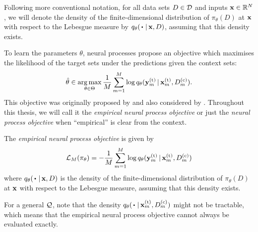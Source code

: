 \documentclass[12pt, twoside]{report}
\begin{document}
Following more conventional notation, for all data sets $D \in \mathcal{D}$ and inputs $\mathbf{x} \in \mathbb{R}^N$,
we will denote the 
density of the finite-dimensional distribution of $\pi_\theta(D)$ at $\mathbf{x}$ with respect to the Lebesgue measure by $q_\theta(\vardot \cond \vx, D)$, assuming that this density exists.

To learn the parameters $\theta$, neural processes propose an objective which maximises the likelihood of the target sets under the predictions given the context sets:
\begin{equation}
    \hat\theta 
    \in
    \argmax_{\theta \in \Theta} \frac1M \sum_{m=1}^M \log q_\theta(\vy\us{(t)}_m \cond \vx\us{(t)}_m, D\us{(c)}_m).
\end{equation}
This objective was originally proposed by \textcite{Garnelo:2018:Conditional_Neural_Processes} and also considered by \textcite{Gordon:2019:Meta-Learning_Probabilistic_Inference_for_Prediction}.
Throughout this thesis, we will call it the \emph{empirical neural process objective} or just the \emph{neural process objective} when ``empirical'' is clear from the context.

\begin{definition}
    \label{def:empirical_neural_process_objective}
    The \emph{empirical neural process objective} is given by
    \begin{equation}
        \L_M(\pi_\theta) = -\frac1M \sum_{m=1}^M \log q_\theta(\vy\us{(t)}_m \cond \vx\us{(t)}_m, D\us{(c)}_m)
    \end{equation}
    where $q_\theta(\vardot \cond \vx, D)$
    is the density of the finite-dimensional distribution of $\pi_\theta(D)$ at $\mathbf{x}$ with respect to the Lebesgue measure, assuming that this density exists.
\end{definition}

For a general $\mathcal{Q}$, note that the density $q_\theta(\vardot \cond \vx\us{(t)}_m, D\us{(c)}_m)$ might not be tractable, which means that the empirical neural process objective cannot always be evaluated exactly.
\end{document}
